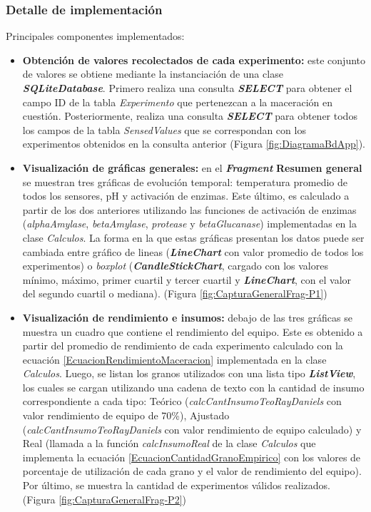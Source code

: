             \subsubsection{Detalle de implementación}
             \par Principales componentes implementados:
             \begin{itemize}
                 \item \textbf{Obtención de valores recolectados de cada experimento:} este conjunto de valores se obtiene mediante la instanciación de una clase \textbf{\textit{\gls{SQLiteDatabase}}}. Primero realiza una consulta \textbf{\textit{\gls{SELECT}}} para obtener el campo ID de la tabla \textit{Experimento} que pertenezcan a la maceración en cuestión. Posteriormente, realiza una consulta \textbf{\textit{\gls{SELECT}}} para obtener todos los campos de la tabla \textit{SensedValues} que se correspondan con los experimentos obtenidos en la consulta anterior (Figura \ref{fig:DiagramaBdApp}).
                 
                 \item \textbf{Visualización de gráficas generales:} en el \textbf{\textit{\gls{Fragment}}} \textbf{Resumen general} se muestran tres gráficas de evolución temporal: temperatura promedio de todos los sensores, pH y activación de enzimas. Este último, es calculado a partir de los dos anteriores utilizando las funciones de activación de enzimas (\textit{alphaAmylase}, \textit{betaAmylase}, \textit{protease} y \textit{betaGlucanase}) implementadas en la clase \textit{Calculos}. La forma en la que estas gráficas presentan los datos puede ser cambiada entre gráfico de lineas (\textbf{\textit{\gls{LineChart}}} con valor promedio de todos los experimentos) o \textit{boxplot} (\textbf{\textit{\gls{CandleStickChart}}}, cargado con los valores mínimo, máximo, primer cuartil y tercer cuartil y \textbf{\textit{\gls{LineChart}}}, con el valor del segundo cuartil o mediana). (Figura \ref{fig:CapturaGeneralFrag-P1})
                 
                 \item \textbf{Visualización de rendimiento e insumos:} debajo de las tres gráficas se muestra un cuadro que contiene el rendimiento del equipo. Este es obtenido a partir del promedio de rendimiento de cada experimento calculado con la ecuación \ref{EcuacionRendimientoMaceracion} implementada en la clase \textit{Calculos}. Luego, se listan los granos utilizados con una lista tipo \textbf{\textit{\gls{ListView}}}, los cuales se cargan utilizando una cadena de texto con la cantidad de insumo correspondiente a cada tipo: Teórico (\textit{calcCantInsumoTeoRayDaniels} con valor rendimiento de equipo de 70\%), Ajustado (\textit{calcCantInsumoTeoRayDaniels} con valor rendimiento de equipo calculado) y Real (llamada a la función \textit{calcInsumoReal} de la clase \textit{Calculos} que implementa la ecuación  \ref{EcuacionCantidadGranoEmpirico} con los valores de porcentaje de utilización de cada grano y el valor de rendimiento del equipo). Por último, se muestra la cantidad de experimentos válidos realizados. (Figura \ref{fig:CapturaGeneralFrag-P2})
                 

\end{itemize}
